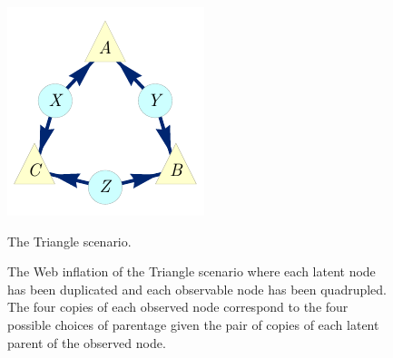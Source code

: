 \begin{figure}[h]
\centering
\begin{minipage}[t]{0.23\linewidth}
\centering
\includegraphics[scale=1]{TriDagRawALT.pdf}
\caption{The Triangle scenario.}\label{fig:TriMainDAG}
\end{minipage}
\hfill
\begin{minipage}[t]{0.43\linewidth}
\centering
{}
\caption{The Web inflation of the 
Triangle scenario where each latent node has been duplicated and each observable node has been quadrupled. The four copies of each observed node correspond to the four possible choices of parentage given the pair of copies of each latent parent of the observed node.}\label{fig:TriFullDouble}
\end{minipage}
\hfill
\begin{minipage}[t]{0.3\linewidth}

\end{minipage}
\end{figure}

